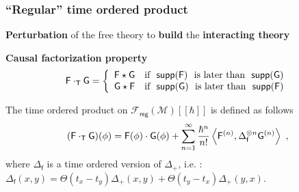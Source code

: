 \documentclass[9pt]{beamer}
\newcommand{\sm}[1]{\left\langle #1 \right\rangle}
\newcommand{\supp}{\mathsf{supp}}
\newcommand{\reg}{\mathsf{reg}}
\newcommand{\Fcal}{\mathcal{F}}
\newcommand{\Mcal}{\mathcal{M}}
\newcommand{\Fsf}{\mathsf{F}}
\newcommand{\Gsf}{\mathsf{G}}
\newcommand{\Tsf}{\mathsf{T}}
\newcommand{\fsf}{\mathsf{f}}
\begin{document}

\begin{frame}
 
\frametitle{``Regular'' time ordered product}

\vfill 

\textbf{Perturbation} of the free theory to \textbf{build} the \textbf{interacting theory}

\vfill

\textbf{Causal factorization property}
%
\vspace*{-8pt}
\begin{equation*}
\Fsf \cdot_\Tsf \Gsf = 
\left\{
\begin{array}{ll}
\Fsf \star \Gsf \quad \mbox{if } \ \supp(\Fsf) \ \mbox{ is later than  } \ \supp(\Gsf)  \\
\Gsf \star \Fsf \quad \mbox{if } \ \supp(\Gsf) \ \mbox{ is later than  } \ \supp(\Fsf) 
\end{array}
\right. 
\vspace*{-12pt}
\end{equation*}

\vfill

\begin{definition}
\vspace*{-8pt}
The time ordered product on $\Fcal_\reg(\Mcal)[[\hbar]]$ is defined as follows
%
\vspace*{-10pt}%
\begin{equation*}
(\Fsf \cdot_\Tsf \Gsf)(\phi) = \Fsf(\phi) \cdot \Gsf(\phi) + \sum_{n=1}^\infty \frac{\hbar^n}{n!} \sm{ \Fsf^{(n)} , \Delta_\fsf^{\otimes n} \Gsf^{(n) } } \ ,
\vspace*{-10pt}%
\end{equation*}
%
where $\Delta_\fsf$ is a time ordered version of $\Delta_+$, i.e. : $\Delta_\fsf(x,y) = \Theta(t_x-t_y) \Delta_+(x,y) + \Theta(t_y-t_x) \Delta_+(y,x)$.
\end{definition}

\vfill 

\end{frame}

\end{document}
